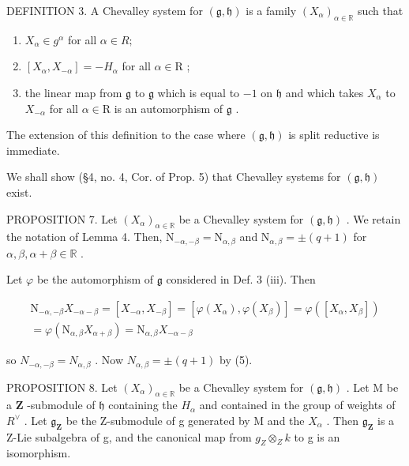 DEFINITION 3. A Chevalley system for \((\mathfrak{g},\mathfrak{h})\) is a family \((X_{\alpha})_{\alpha \in \mathbb{R}}\) such that

\begin{enumerate}
\def\labelenumi{(\roman{enumi})}
\item
  \(X_{\alpha} \in g^{\alpha}\) for all \(\alpha \in R;\)
\item
  \([X_{\alpha}, X_{-\alpha}] = -H_{\alpha}\) for all \(\alpha \in \mathrm{R}\) ;
\item
  the linear map from \(\mathfrak{g}\) to \(\mathfrak{g}\) which is equal to \(-1\) on \(\mathfrak{h}\) and which takes \(X_{\alpha}\) to \(X_{-\alpha}\) for all \(\alpha \in \mathrm{R}\) is an automorphism of \(\mathfrak{g}\) .
\end{enumerate}

The extension of this definition to the case where \((\mathfrak{g},\mathfrak{h})\) is split reductive is immediate.

We shall show (§4, no. 4, Cor. of Prop. 5) that Chevalley systems for \((\mathfrak{g},\mathfrak{h})\) exist.

PROPOSITION 7. Let \((X_{\alpha})_{\alpha \in \mathbb{R}}\) be a Chevalley system for \((\mathfrak{g},\mathfrak{h})\) . We retain the notation of Lemma 4. Then, \(\mathrm{N}_{-\alpha, - \beta} = \mathrm{N}_{\alpha ,\beta}\) and \(\mathrm{N}_{\alpha ,\beta} = \pm (q + 1)\) for \(\alpha ,\beta ,\alpha +\beta \in \mathbb{R}\) .

Let \(\varphi\) be the automorphism of \(\mathfrak{g}\) considered in Def. 3 (iii). Then

\[
\begin{array}{r} \mathrm{N} _ {- \alpha , - \beta} X _ {- \alpha - \beta} = [ X _ {- \alpha}, X _ {- \beta} ] = [ \varphi (X _ {\alpha}), \varphi (X _ {\beta}) ] = \varphi ([ X _ {\alpha}, X _ {\beta} ]) \\ = \varphi (\mathrm{N} _ {\alpha , \beta} X _ {\alpha + \beta}) = \mathrm{N} _ {\alpha , \beta} X _ {- \alpha - \beta} \end{array}
\]

so \(N_{-\alpha,-\beta}=N_{\alpha,\beta}\) . Now \(N_{\alpha,\beta}=\pm(q+1)\) by (5).

PROPOSITION 8. Let \((X_{\alpha})_{\alpha \in \mathbb{R}}\) be a Chevalley system for \((\mathfrak{g},\mathfrak{h})\) . Let \(\mathrm{M}\) be a \(\mathbf{Z}\) -submodule of \(\mathfrak{h}\) containing the \(H_{\alpha}\) and contained in the group of weights of \(R^{\vee}\) . Let \(\mathfrak{g}_{\mathbf{Z}}\) be the Z-submodule of g generated by M and the \(X_{\alpha}\) . Then \(\mathfrak{g}_{\mathbf{Z}}\) is a Z-Lie subalgebra of g, and the canonical map from \(g_{Z} \otimes_{Z} k\) to g is an isomorphism.

